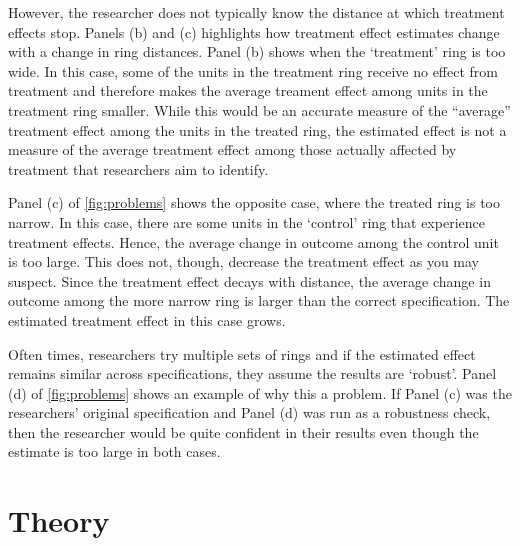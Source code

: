 \documentclass[10pt]{article}
\begin{document}
However, the researcher does not typically know the distance at which treatment effects stop. Panels (b) and (c) highlights how treatment effect estimates change with a change in ring distances. Panel (b) shows when the `treatment' ring is too wide. In this case, some of the units in the treatment ring receive no effect from treatment and therefore makes the average treament effect among units in the treatment ring smaller. While this would be an accurate measure of the ``average'' treatment effect among the units in the treated ring, the estimated effect is not a measure of the average treatment effect among those actually affected by treatment that researchers aim to identify.

Panel (c) of \autoref{fig:problems} shows the opposite case, where the treated ring is too narrow. In this case, there are some units in the `control' ring that experience treatment effects. Hence, the average change in outcome among the control unit is too large. This does not, though, decrease the treatment effect as you may suspect. Since the treatment effect decays with distance, the average change in outcome among the more narrow ring is larger than the correct specification. The estimated treatment effect in this case grows. 

Often times, researchers try multiple sets of rings and if the estimated effect remains similar across specifications, they assume the results are `robust'. Panel (d) of \autoref{fig:problems} shows an example of why this a problem. If Panel (c) was the researchers' original specification and Panel (d) was run as a robustness check, then the researcher would be quite confident in their results even though the estimate is too large in both cases. 











\section{Theory}
\end{document}
